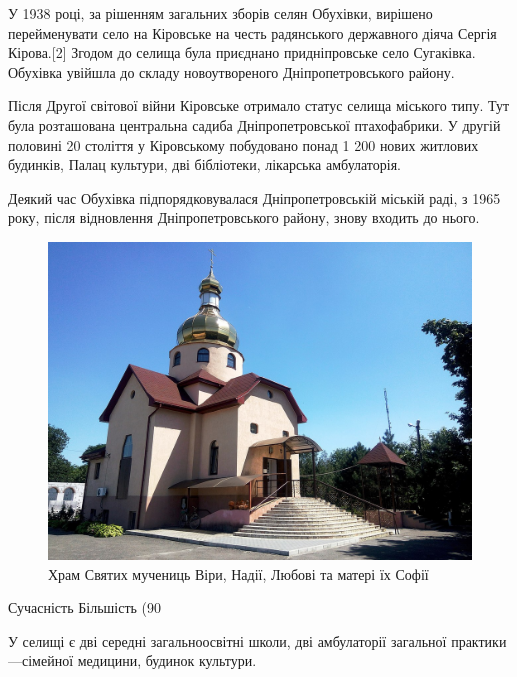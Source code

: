 \documentclass[12pt]{article} %
\begin{document}
У 1938 році, за рішенням загальних зборів селян Обухівки, вирішено перейменувати село на Кіровське на честь радянського державного діяча Сергія Кірова.[2] Згодом до селища була приєднано придніпровське село Сугаківка. Обухівка увійшла до складу новоутвореного Дніпропетровського району.

Після Другої світової війни Кіровське отримало статус селища міського типу. Тут була розташована центральна садиба Дніпропетровської птахофабрики. У другій половині 20 століття у Кіровському побудовано понад 1 200 нових житлових будинків, Палац культури, дві бібліотеки, лікарська амбулаторія.

Деякий час Обухівка підпорядковувалася Дніпропетровській міській раді, з 1965 року, після відновлення Дніпропетровського району, знову входить до нього.

\begin{figure}[h]
	\centering
	\includegraphics[width=0.8\linewidth]{23}
	\caption{\label{fig:frog3}Храм Святих мучениць Віри, Надії, Любові та матері їх Софії}
	\label{fig:23}
\end{figure}

Сучасність
Більшість (90 %

У селищі є дві середні загальноосвітні школи, дві амбулаторії загальної практики—сімейної медицини, будинок культури.
\end{document}
